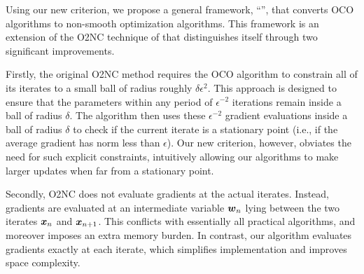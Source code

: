 
Using our new criterion, we propose a general framework, ``\alg'', that converts OCO algorithms to non-smooth optimization algorithms. This framework is an extension of the  O2NC technique of \citet{cutkosky2023optimal} that distinguishes itself through two significant improvements.

Firstly, the original O2NC method requires the OCO algorithm to constrain all of its iterates to a small ball of radius roughly $\delta\epsilon^2$. 
This approach is designed to ensure that the parameters within any period of $\epsilon^{-2}$ iterations remain inside a ball of radius $\delta$. The algorithm then uses these $\epsilon^{-2}$ gradient evaluations inside a ball of radius $\delta$ to check if the current iterate is a stationary point (i.e., if the average gradient has norm less than $\epsilon$). Our new criterion, however, obviates the need for such explicit constraints, intuitively allowing our algorithms to make larger updates when far from a stationary point.

Secondly, O2NC does not evaluate gradients at the actual iterates. Instead, gradients are evaluated at an intermediate variable ${\boldsymbol{w}}_n$ lying between the two iterates ${\boldsymbol{x}}_n$ and ${\boldsymbol{x}}_{n+1}$. This conflicts with essentially all practical  algorithms, and moreover imposes an extra memory burden. In contrast, our algorithm evaluates  gradients exactly at each iterate, which simplifies implementation and improves space complexity.

